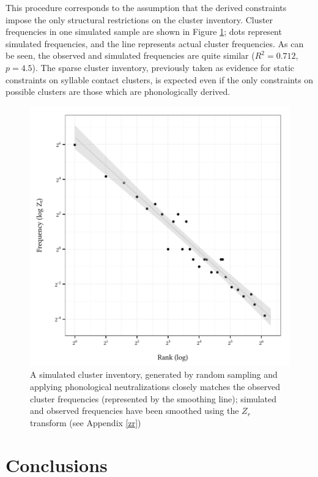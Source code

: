 This procedure corresponds to the assumption that the derived constraints impose the only structural restrictions on the cluster inventory.
Cluster frequencies in one simulated sample are shown in Figure \ref{sim}; dots represent simulated frequencies, and the line represents actual cluster frequencies.
As can be seen, the observed and simulated frequencies are quite similar 
($R^2 = 0.712$, $p = 4.5$).
The sparse cluster inventory, previously taken as evidence for static constraints on syllable contact clusters, is expected even if the only constraints on possible clusters are those which are phonologically derived.

\begin{figure}[t]
\centering
\includegraphics{sim.pdf}
\caption{A simulated cluster inventory, generated by random sampling and applying phonological neutralizations closely matches the observed cluster frequencies (represented by the smoothing line); simulated and observed frequencies have been smoothed using the $Z_r$ transform (see Appendix \ref{zr})}
\label{sim}
\end{figure}

\section{Conclusions}

